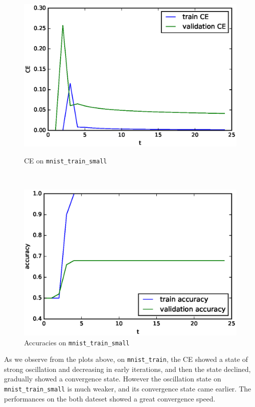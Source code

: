 \documentclass[10pt]{article}
\begin{document}
\begin{figure}[H]
\centering
\begin{minipage}[b]{0.45\textwidth}
\centering
\includegraphics[scale=.5]{plot_small_ce.eps}
\caption{CE on \texttt{mnist\_train\_small}}
\label{plot_small_ce}
\end{minipage}
\
\begin{minipage}[b]{0.45\textwidth}
\centering
\includegraphics[scale=.5]{plot_small_acc.eps}
\caption{Accuracies on \texttt{mnist\_train\_small}}
\label{plot_small_acc}
\end{minipage}
\end{figure}
As we observe from the plots above, on \texttt{mnist\_train}, the CE showed a state of strong oscillation and decreasing in early iterations, and then the state declined, gradually showed a convergence state. However the oscillation state on \texttt{mnist\_train\_small} is much weaker, and its convergence state came earlier. The performances on the both dateset showed a great convergence speed.\par
\end{document}
